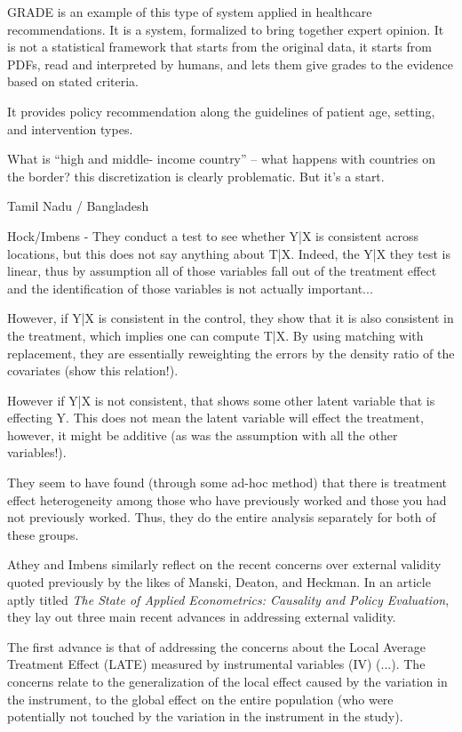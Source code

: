\documentclass[a4paper,12pt]{article}
\begin{document}
GRADE is an example of this type of system applied in healthcare recommendations. It is a system, formalized to bring together expert opinion. It is not a statistical framework that starts from the original data, it starts from PDFs, read and interpreted by humans, and lets them give grades to the evidence based on stated criteria. 

It provides policy recommendation along the guidelines of patient age, setting, and intervention types. 

What is ``high and middle- income country'' -- what happens with countries on the border? this discretization is clearly problematic. But it's a start. 


Tamil Nadu / Bangladesh

Hock/Imbens - They conduct a test to see whether Y|X is consistent across locations, but this does not say anything about T|X. Indeed, the Y|X they test is linear, thus by assumption all of those variables fall out of the treatment effect and the identification of those variables is not actually important... 

However, if Y|X is consistent in the control, they show that it is also consistent in the treatment, which implies one can compute T|X. By using matching with replacement, they are essentially reweighting the errors by the density ratio of the covariates (show this relation!). 

However if Y|X is not consistent, that shows some other latent variable that is effecting Y. This does not mean the latent variable will effect the treatment, however, it might be additive (as was the assumption with all the other variables!). 

They seem to have found (through some ad-hoc method) that there is treatment effect heterogeneity among those who have previously worked and those you had not previously worked. Thus, they do the entire analysis separately for both of these groups. 





Athey and Imbens \parencite*{Athey2017} similarly reflect on the recent concerns over external validity quoted previously by the likes of Manski, Deaton, and Heckman. In an article aptly titled \textit{The State of Applied Econometrics: Causality and Policy Evaluation}, they lay out three main recent advances in addressing external validity.

The first advance is that of addressing the concerns about the Local Average Treatment Effect (LATE) measured by instrumental variables (IV) (...). The concerns relate to the generalization of the local effect caused by the variation in the instrument, to the global effect on the entire population (who were potentially not touched by the variation in the instrument in the study).
\end{document}
